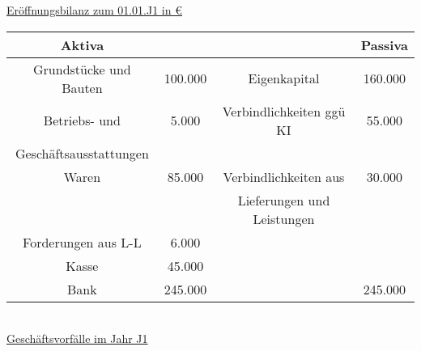 \documentclass[paper=a4, fontsize=11pt]{scrartcl}
\numberwithin{equation}{section}
\numberwithin{figure}{section}
\numberwithin{table}{section}
\begin{document}
\underline{Eröffnungsbilanz zum 01.01.J1 in €}

\begin{tabular}{cc|cc}
\hline
Aktiva & &&  Passiva \\
\hline
Grundstücke und Bauten & 100.000 & Eigenkapital & 160.000 \\
Betriebs- und & 5.000 & Verbindlichkeiten ggü KI & 55.000 \\
Geschäftsausstattungen & & & \\
Waren & 85.000 & Verbindlichkeiten aus & 30.000 \\
 & & Lieferungen und Leistungen & \\
 Forderungen aus L-L & 6.000 & & \\
 Kasse & 45.000 & & \\
 Bank & 245.000 & & 245.000 \\
 \hline
\end{tabular}
\\

\underline{Geschäftsvorfälle im Jahr J1}
\end{document}
